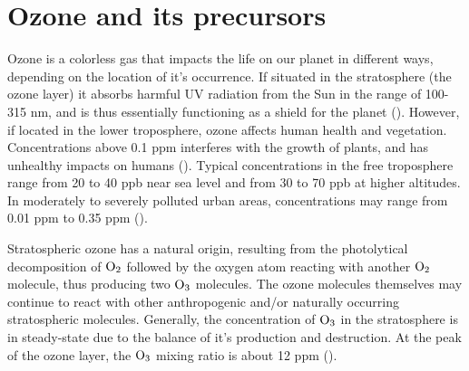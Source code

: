 





\section{Ozone and its precursors}\label{sec:ozone_and_precursors}

Ozone is a colorless gas that impacts the life on our planet in different ways, depending on the location of it's occurrence. If situated in the stratosphere (the ozone layer) it absorbs harmful UV radiation from the Sun in the range of 100-315 nm, and is thus essentially functioning as a shield for the planet (\cite{SeinfeldSpyros}). However, if located in the lower troposphere, ozone affects human health and vegetation. Concentrations above 0.1 \acrfull{ppm} interferes with the growth of plants, and has unhealthy impacts on humans (\cite{AtmModFund}). Typical concentrations in the free troposphere range from 20 to 40 \acrfull{ppb} near sea level and from 30 to 70 ppb at higher altitudes. In moderately to severely polluted urban areas, concentrations may range from 0.01 ppm to 0.35 ppm (\cite{AtmModFund}).  

\medskip

Stratospheric ozone has a natural origin, resulting from the photolytical decomposition of $\mathrm{O_2}$ followed by the oxygen atom reacting with another $\mathrm{O_2}$ molecule, thus producing two $\mathrm{O_3}$ molecules. The ozone molecules themselves may continue to react with other anthropogenic and/or naturally occurring stratospheric molecules. Generally, the concentration of $\mathrm{O_3}$ in the stratosphere is in steady-state due to the balance of it's production and destruction. At the peak of the ozone layer, the $\mathrm{O_3}$ mixing ratio is about 12 ppm (\cite{SeinfeldSpyros}).  


